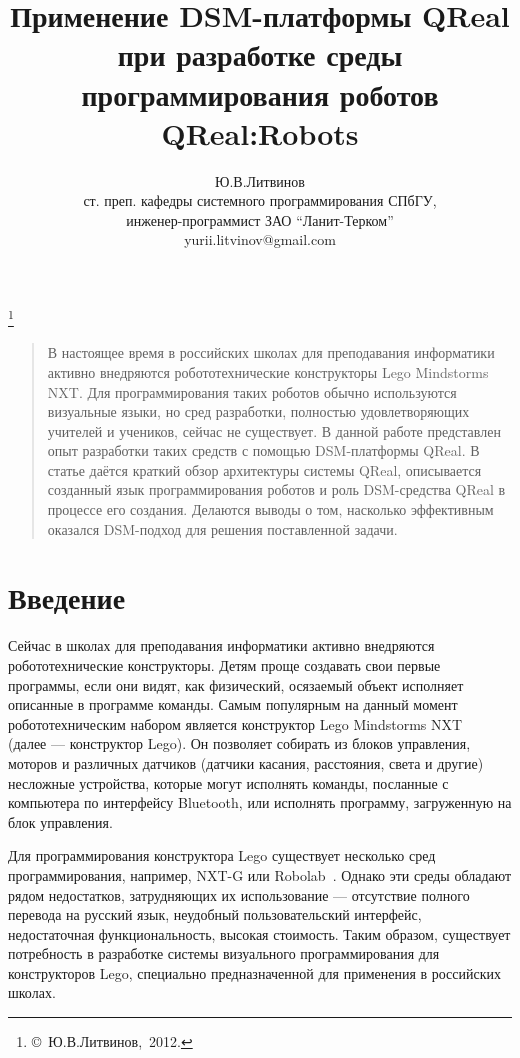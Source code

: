 \documentclass[a4paper]{article}
\title{Применение DSM-платформы QReal при разработке среды программирования роботов QReal:Robots}
\author{Ю.В.Литвинов \\ ст. преп. кафедры системного программирования СПбГУ, \\ инженер-программист ЗАО ``Ланит-Терком'' \\ yurii.litvinov@gmail.com}
\date{}
\begin{document}
\maketitle
\thispagestyle{empty}

\renewcommand{\thefootnote}{}
\footnote{\small{\copyright~Ю.В.Литвинов,~2012.}}
\renewcommand{\thefootnote}{\arabic{footnote}}
\setcounter{footnote}{0}

\begin{quote}
\small\noindent
В настоящее время в российских школах для преподавания информатики активно внедряются робототехнические конструкторы Lego Mindstorms NXT. Для программирования таких роботов обычно используются визуальные языки, но сред разработки, полностью удовлетворяющих  учителей и учеников, сейчас не существует. В данной работе представлен опыт разработки таких средств с помощью DSM-платформы QReal. В статье даётся краткий обзор архитектуры системы QReal, описывается созданный язык программирования роботов и роль DSM-средства QReal в процессе его создания. Делаются выводы о том, насколько эффективным оказался DSM-подход для решения поставленной задачи.
\end{quote}

\section*{Введение}
Сейчас в школах для преподавания информатики активно внедряются робототехнические конструкторы. Детям проще создавать свои первые программы, если они видят, как физический, осязаемый объект исполняет описанные в программе команды. Самым популярным на данный момент робототехническим набором является конструктор Lego Mindstorms NXT~\cite{legoNxt} (далее --- конструктор Lego). Он позволяет собирать из блоков управления, моторов и различных датчиков (датчики касания, расстояния, света и другие) несложные устройства, которые могут исполнять команды, посланные с компьютера по интерфейсу Bluetooth, или исполнять программу, загруженную на блок управления.

Для программирования конструктора Lego существует несколько сред программирования, например, NXT-G или Robolab~\cite{robolabHome}. Однако эти среды обладают рядом недостатков, затрудняющих их использование --- отсутствие полного перевода на русский язык, неудобный пользовательский интерфейс, недостаточная функциональность, высокая стоимость. Таким образом, существует потребность в разработке системы визуального программирования для конструкторов Lego, специально предназначенной для применения в российских школах.
\end{document}
